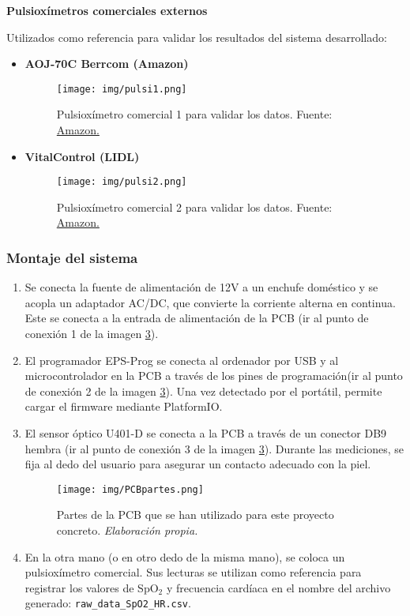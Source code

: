 \newpage

\textbf{Pulsioxímetros comerciales externos}

Utilizados como referencia para validar los resultados del sistema desarrollado:
    \begin{itemize}
        \item \textbf{AOJ-70C Berrcom (Amazon)}
        \begin{figure}[H]
            \centering
            \texttt{[image: img/pulsi1.png]}
            \caption{Pulsioxímetro comercial 1 para validar los datos. Fuente: \href{https://www.amazon.es/}{Amazon.}}
            \label{fig:pulsi1}
        \end{figure}
        \item \textbf{VitalControl (LIDL)}
        \begin{figure}[H]
            \centering
            \texttt{[image: img/pulsi2.png]}
            \caption{Pulsioxímetro comercial 2 para validar los datos. Fuente: \href{https://www.amazon.es/}{Amazon.}}
            \label{fig:pulsi2}
        \end{figure}
    \end{itemize}


\subsubsection{Montaje del sistema}

\begin{enumerate}
    \item Se conecta la fuente de alimentación de 12V a un enchufe doméstico y se acopla un adaptador AC/DC, que convierte la corriente alterna en continua. Este se conecta a la entrada de alimentación de la PCB (ir al punto de conexión 1 de la imagen \ref{fig:PCBpartes}).
    \item El programador EPS-Prog se conecta al ordenador por USB y al microcontrolador en la PCB a través de los pines de programación(ir al punto de conexión 2 de la imagen \ref{fig:PCBpartes}). Una vez detectado por el portátil, permite cargar el firmware mediante PlatformIO.
    \item El sensor óptico U401-D se conecta a la PCB a través de un conector DB9 hembra (ir al punto de conexión 3 de la imagen \ref{fig:PCBpartes}). Durante las mediciones, se fija al dedo del usuario para asegurar un contacto adecuado con la piel.
    \begin{figure}[H]
        \centering
        \texttt{[image: img/PCBpartes.png]}
        \caption{Partes de la PCB que se han utilizado para este proyecto concreto. \textit{Elaboración propia.}}
        \label{fig:PCBpartes}
    \end{figure}
    \item En la otra mano (o en otro dedo de la misma mano), se coloca un pulsioxímetro comercial. Sus lecturas se utilizan como referencia para registrar los valores de SpO$_2$ y frecuencia cardíaca en el nombre del archivo generado: \texttt{raw\_data\_SpO2\_HR.csv}.
\end{enumerate}

